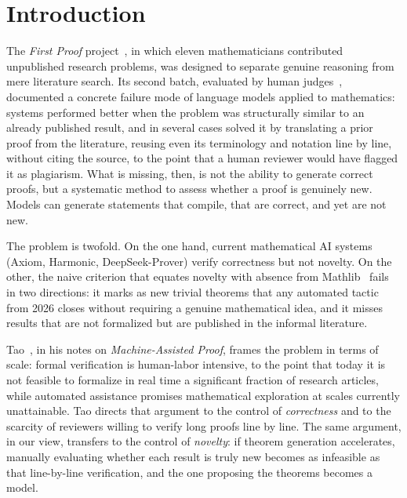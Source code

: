\section{Introduction}

The \textit{First Proof} project~\cite{abouzaid2026}, in which eleven mathematicians contributed unpublished research problems, was designed to separate genuine reasoning from mere literature search. Its second batch, evaluated by human judges~\cite{firstproof2b}, documented a concrete failure mode of language models applied to mathematics: systems performed better when the problem was structurally similar to an already published result, and in several cases solved it by translating a prior proof from the literature, reusing even its terminology and notation line by line, without citing the source, to the point that a human reviewer would have flagged it as plagiarism. What is missing, then, is not the ability to generate correct proofs, but a systematic method to assess whether a proof is genuinely new. Models can generate statements that compile, that are correct, and yet are not new.

The problem is twofold. On the one hand, current mathematical AI systems (Axiom, Harmonic, DeepSeek-Prover) verify correctness but not novelty. On the other, the naive criterion that equates novelty with absence from Mathlib~\cite{kasaura2025} fails in two directions: it marks as new trivial theorems that any automated tactic from 2026 closes without requiring a genuine mathematical idea, and it misses results that are not formalized but are published in the informal literature.

Tao~\cite{tao2025}, in his notes on \textit{Machine-Assisted Proof}, frames the problem in terms of scale: formal verification is human-labor intensive, to the point that today it is not feasible to formalize in real time a significant fraction of research articles, while automated assistance promises mathematical exploration at scales currently unattainable. Tao directs that argument to the control of \emph{correctness} and to the scarcity of reviewers willing to verify long proofs line by line. The same argument, in our view, transfers to the control of \emph{novelty}: if theorem generation accelerates, manually evaluating whether each result is truly new becomes as infeasible as that line-by-line verification, and the one proposing the theorems becomes a model.

